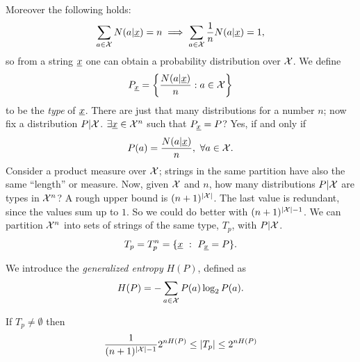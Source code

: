 Moreover the following holds:
\begin{equation*}
	\sum_{a \in \mathcal{X}} N(a|\underline{x}) = n
	\implies \sum_{a\in \mathcal{X}} \frac{1}{n} N(a|\underline{x}) = 1,
\end{equation*}
so from a string $\underline{x}$ one can obtain a probability distribution over $\mathcal{X}$.
We define
\begin{equation*}
	P_{\underline{x}} = \left\{ \frac{N(a|\underline{x})}{n} : a \in \mathcal{X} \right\}
\end{equation*}
to be the \emph{type} of $\underline{x}$.
There are just that many distributions for a number $n$; now fix a distribution $P|\mathcal{X}$.
$\exists \underline{x} \in \mathcal{X}^n$ such that  $P_{\underline{x}} = P$?
Yes, if and only if
\begin{equation*}
	P(a) = \dfrac{N(a | \underline{x})}{n},\ \forall a \in \mathcal{X}.
\end{equation*}
Consider a product measure over $\mathcal{X}$; strings in the same partition have also the same ``length'' or measure.
Now, given $\mathcal{X}$ and $n$, how many distributions $P|\mathcal{X}$ are types in $\mathcal{X}^n$?
A rough upper bound is $(n + 1)^{\left|{\mathcal{X}}\right|}$.
The last value is redundant, since the values sum up to $1$.
So we could do better with $(n + 1)^{\left|{\mathcal{X}}\right| - 1}$.
We can partition $\mathcal{X}^n$ into sets of strings of the same type, $T_p$, with $P|\mathcal{X}$.
\begin{equation*}
	T_p = T_p^n = \{\underline{x}\ :\ P_{\underline{x}} = P\}.
\end{equation*}

\begin{definition}
	We introduce the \emph{generalized entropy} $H(P)$, defined as
	\begin{equation*}
		H(P) = -\sum_{a \in \mathcal{X}} P(a) \log_2 P(a).
	\end{equation*}
\end{definition}

\begin{thm} \label{thms:taupcard}
	If $T_p \neq \emptyset$ then $$\dfrac{1}{(n+1)^{|\mathcal{X}| -1}}2^{nH(P)}\leq |T_p| \leq 2^{nH(P)}$$
\end{thm}

